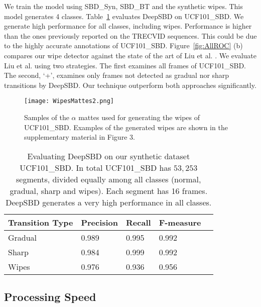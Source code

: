 \documentclass[journal]{IEEEtran}
\begin{document}
We train the model using SBD\_Syn, SBD\_BT and the synthetic wipes. This model generates 4 classes. Table~\ref{tab:UCF101_SBD} evaluates DeepSBD on UCF101\_SBD. 
We generate high performance for all classes, including wipes. Performance is higher than the ones previously reported on the TRECVID sequences. This could be due to the highly accurate annotations of UCF101\_SBD. Figure~\ref{fig:AllROC} (b) compares our wipe detector against the state of the art of Liu et al. \cite{Liu07}. We evaluate Liu et al. using two strategies. The first examines all frames of UCF101\_SBD. The second, `+', examines only frames not detected as gradual nor sharp transitions by DeepSBD. Our technique outperform both approaches significantly.  

\begin{figure}
  \centering
   \texttt{[image: WipesMattes2.png]}
   \caption{Samples of the $\alpha$ mattes used for generating the wipes of UCF101\_SBD. Examples of the generated wipes are shown in the supplementary material in Figure 3.}
\label{fig:Wipes}
 \end{figure}



\begin{table}
\small
\centering
\begin{tabular}{| l | l | l | l | l | }
     \hline      
			Transition Type							    & Precision      & Recall   & F-measure     \\
     \hline
					Gradual              	& 0.989	& 0.995	& 0.992 \\
			   Sharp                 & 0.984	& 0.999	& 0.992 \\
				 Wipes                & 0.976	& 0.936	& 0.956 \\
\hline 
    \end{tabular}\vspace{3pt}
\caption{Evaluating DeepSBD on our synthetic dataset UCF101\_SBD. In total UCF101\_SBD has $53,253$ segments, divided equally among all classes (normal, gradual, sharp and wipes). Each segment has 16 frames. DeepSBD generates a very high performance in all classes.}
\label{tab:UCF101_SBD}
\end{table}




\subsection{Processing Speed}
\end{document}
